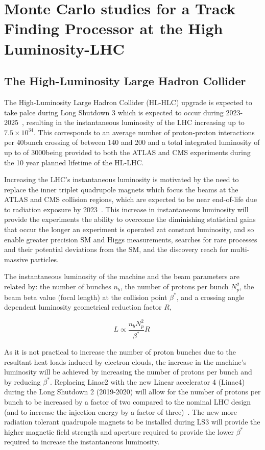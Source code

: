 \chapter{Monte Carlo studies for a Track Finding Processor at the High Luminosity-LHC}\label{chapter:tk-upgrade}
 
\section{The High-Luminosity Large Hadron Collider} \label{sec:hl-lhc}
The High-Luminosity Large Hadron Collider (HL-HLC) upgrade is expected to take palce during Long Shutdown 3 which is expected to occur during 2023-2025~\cite{ApollinariG.:2017ojx}, resulting in the instantaneous luminosity of the LHC increasing up to $7.5 \times {10}^{34}$\percms.
This corresponds to an average number of proton-proton interactions per 40\MHz bunch crossing of between 140 and 200 and a total integrated luminosity of up to of 3000\fbinv being provided to both the ATLAS and CMS experiments during the 10 year planned lifetime of the HL-LHC.

Increasing the LHC's instantaneous luminosity is motivated by the need to replace the inner triplet quadrupole magnets which focus the beams at the ATLAS and CMS collision regions, which are expected to be near end-of-life due to radiation exposure by 2023~\cite{hl-lhc-prelim-design-report,CMSCollaboration:2015zni}.
This increase in instantaneous luminosity will provide the experiments the ability to overcome the diminishing statistical gains that occur the longer an experiment is operated zat constant luminosity, and so enable greater precision SM and Higgs measurements, searches for rare processes and their potential deviations from the SM, and the discovery reach for multi- massive particles.

The instantaneous luminosity of the machine and the beam parameters are related by: the number of bunches $n_{b}$, the number of protons per bunch $N^{2}_{p}$, the beam beta value (focal length) at the collision point $\beta^{*}$, and a crossing angle dependent luminosity geometrical reduction factor $R$,

\begin{equation}
L \propto \frac{n_{b}N^{2}_{p}}{\beta^{*}} R  \;
\label{eq:machineLumi}
\end{equation}

As it is not practical to increase the number of proton bunches due to the resultant heat loads induced by electron clouds, the increase in the machine's luminosity will be achieved by increasing the number of protons per bunch and by reducing $\beta^{*}$.
Replacing Linac2 with the new Linear accelerator 4 (Linac4) during the Long Shutdown 2 (2019-2020) will allow for the number of protons per bunch to be increased by a factor of two compared to the nominal LHC design (and to increase the injection energy by a factor of three)~\cite{linac4}.
The new more radiation tolerant quadrupole magnets to be installed during LS3 will provide the higher magnetic field strength and aperture required to provide the lower $\beta^{*}$ required to increase the instantaneous luminosity. 

